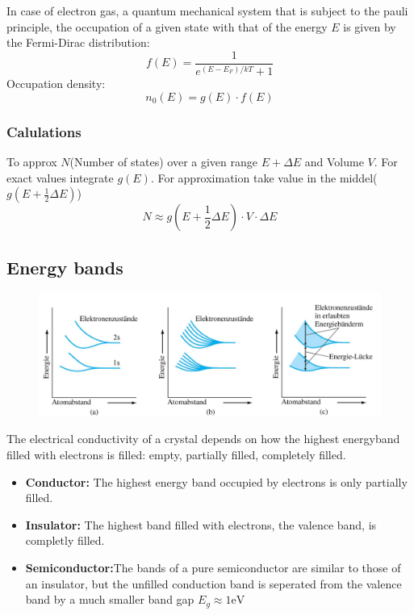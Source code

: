 In case of electron gas, a quantum mechanical system that is subject to the pauli principle, the occupation of a given state with that of the energy \(E\) is given by the Fermi-Dirac distribution:
\[
f(E) = \frac{1}{e^{(E-E_F)/kT} + 1}
\]
Occupation density:
\[
n_0(E) = g(E)\cdot f(E)
\]
\subsubsection{Calulations}
To approx \(N\)(Number of states) over a given range \(E + \Delta E\) and Volume \(V\). For exact values integrate \(g(E)\). For approximation take value in the middel(\(g(E + \frac{1}{2}\Delta E)\))
\begin{equation*}
    N \approx g(E + \frac{1}{2}\Delta E) \cdot V \cdot \Delta E
\end{equation*}
\subsection{Energy bands}
\begin{figure}[h]
    \centering
    \includegraphics[width=\columnwidth]{images/bandmodel.png}
    \label{fig:bandmodel}
\end{figure}
The electrical conductivity of a crystal depends on how the highest energyband filled with electrons is filled: empty, partially filled, completely filled.
\begin{itemize}
    \item \textbf{Conductor:} The highest energy band occupied by electrons is only partially filled.
    \item \textbf{Insulator:} The highest band filled with electrons, the valence band, is completly filled.
    \item \textbf{Semiconductor:}The bands of a pure semiconductor are similar to those of an insulator, but the unfilled conduction band is seperated from the valence band by a much smaller band gap \(E_g\approx 1 \text{eV}\)
\end{itemize}
